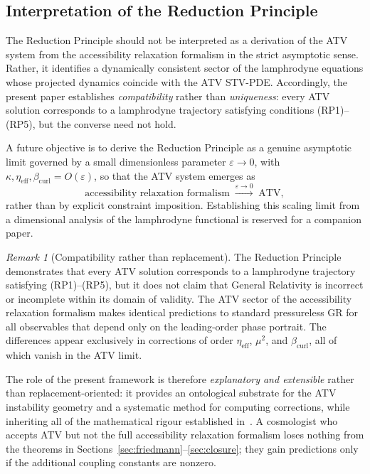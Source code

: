 \documentclass[12pt,a4paper]{article}
\theoremstyle{plain}
\theoremstyle{definition}
\theoremstyle{remark}
\newtheorem{remark}[theorem]{Remark}
\newcommand{\etaeff}{\eta_{\mathrm{eff}}}
\newcommand{\bcurl}{\beta_{\mathrm{curl}}}
\begin{document}
\subsection{Interpretation of the Reduction Principle}
\label{subsec:reduction_interpretation}

The Reduction Principle should not be interpreted as a derivation of the ATV
system from the accessibility relaxation formalism in the strict asymptotic sense.
Rather, it identifies a dynamically consistent sector of the lamphrodyne equations
whose projected dynamics coincide with the ATV STV-PDE. Accordingly, the present
paper establishes \emph{compatibility} rather than \emph{uniqueness}: every ATV
solution corresponds to a lamphrodyne trajectory satisfying conditions
(RP1)--(RP5), but the converse need not hold.

A future objective is to derive the Reduction Principle as a genuine asymptotic
limit governed by a small dimensionless parameter $\varepsilon \to 0$, with
$\kappa, \etaeff, \bcurl = O(\varepsilon)$, so that the ATV system emerges as
\begin{equation}
  \text{accessibility relaxation formalism}
  \;\xrightarrow{\varepsilon\to 0}\;
  \text{ATV},
  \label{eq:asymptotic_limit}
\end{equation}
rather than by explicit constraint imposition. Establishing this scaling limit
from a dimensional analysis of the lamphrodyne functional is reserved for a
companion paper.

\begin{remark}[Compatibility rather than replacement]
\label{rem:compatibility}
The Reduction Principle demonstrates that every ATV solution corresponds to a
lamphrodyne trajectory satisfying (RP1)--(RP5), but it does not claim that
General Relativity is incorrect or incomplete within its domain of validity.
The ATV sector of the accessibility relaxation formalism makes identical
predictions to standard pressureless GR for all observables that depend only
on the leading-order phase portrait. The differences appear exclusively in
corrections of order $\etaeff$, $\mu^2$, and $\bcurl$, all of which vanish
in the ATV limit.

The role of the present framework is therefore \emph{explanatory and extensible}
rather than replacement-oriented: it provides an ontological substrate for the
ATV instability geometry and a systematic method for computing corrections, while
inheriting all of the mathematical rigour established in~\cite{Smoller2012,STV2017,ATV2026}.
A cosmologist who accepts ATV but not the full accessibility relaxation formalism
loses nothing from the theorems in Sections~\ref{sec:friedmann}--\ref{sec:closure};
they gain predictions only if the additional coupling constants are nonzero.
\end{remark}
\end{document}

